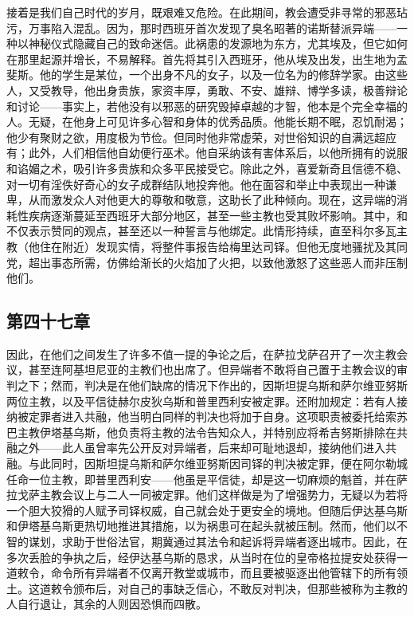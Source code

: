 接着是我们自己时代的岁月，既艰难又危险。在此期间，教会遭受非寻常的邪恶玷污，万事陷入混乱。因为，那时西班牙首次发现了臭名昭著的诺斯替派异端——一种以神秘仪式隐藏自己的致命迷信。此祸患的发源地为东方，尤其埃及，但它如何在那里起源并增长，不易解释。首先将其引入西班牙，他从埃及出发，出生地为孟斐斯。他的学生是某位，一个出身不凡的女子，以及一位名为的修辞学家。由这些人，又受教导，他出身贵族，家资丰厚，勇敢、不安、雄辩、博学多读，极善辩论和讨论——事实上，若他没有以邪恶的研究毁掉卓越的才智，他本是个完全幸福的人。无疑，在他身上可见许多心智和身体的优秀品质。他能长期不眠，忍饥耐渴；他少有聚财之欲，用度极为节俭。但同时他非常虚荣，对世俗知识的自满远超应有；此外，人们相信他自幼便行巫术。他自采纳该有害体系后，以他所拥有的说服和谄媚之术，吸引许多贵族和众多平民接受它。除此之外，喜爱新奇且信德不稳、对一切有淫佚好奇心的女子成群结队地投奔他。他在面容和举止中表现出一种谦卑，从而激发众人对他更大的尊敬和敬意，这助长了此种倾向。现在，这异端的消耗性疾病逐渐蔓延至西班牙大部分地区，甚至一些主教也受其败坏影响。其中，和不仅表示赞同的观点，甚至还以一种誓言与他绑定。此情形持续，直至科尔多瓦主教（他住在附近）发现实情，将整件事报告给梅里达司铎。但他无度地骚扰及其同党，超出事态所需，仿佛给渐长的火焰加了火把，以致他激怒了这些恶人而非压制他们。\par


\subsection{第四十七章}

因此，在他们之间发生了许多不值一提的争论之后，在萨拉戈萨召开了一次主教会议，甚至连阿基坦尼亚的主教们也出席了。但异端者不敢将自己置于主教会议的审判之下；然而，判决是在他们缺席的情况下作出的，因斯坦提乌斯和萨尔维亚努斯两位主教，以及平信徒赫尔皮狄乌斯和普里西利安被定罪。还附加规定：若有人接纳被定罪者进入共融，他当明白同样的判决也将加于自身。这项职责被委托给索苏巴主教伊塔基乌斯，他负责将主教的法令告知众人，并特别应将希吉努斯排除在共融之外——此人虽曾率先公开反对异端者，后来却可耻地退却，接纳他们进入共融。与此同时，因斯坦提乌斯和萨尔维亚努斯因司铎的判决被定罪，便在阿尔勒城任命一位主教，即普里西利安——他虽是平信徒，却是这一切麻烦的魁首，并在萨拉戈萨主教会议上与二人一同被定罪。他们这样做是为了增强势力，无疑以为若将一个胆大狡猾的人赋予司铎权威，自己就会处于更安全的境地。但随后伊达基乌斯和伊塔基乌斯更热切地推进其措施，以为祸患可在起头就被压制。然而，他们以不智的谋划，求助于世俗法官，期冀通过其法令和起诉将异端者逐出城市。因此，在多次丢脸的争执之后，经伊达基乌斯的恳求，从当时在位的皇帝格拉提安处获得一道敕令，命令所有异端者不仅离开教堂或城市，而且要被驱逐出他管辖下的所有领土。这道敕令颁布后，对自己的事缺乏信心，不敢反对判决，但那些被称为主教的人自行退让，其余的人则因恐惧而四散。\par

